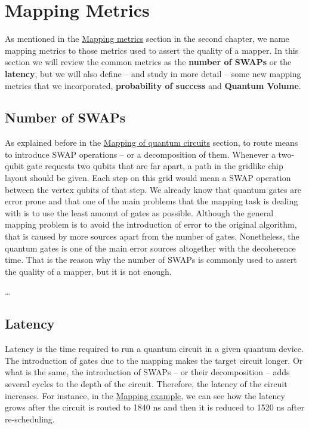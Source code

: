\section*{Mapping Metrics}
\label{sec:orgcd731e4}
As mentioned in the \href{chapter-2.org}{Mapping metrics} section in the second chapter, we name mapping metrics to those metrics used to assert the quality of a mapper.
In this section we will review the common metrics as the \textbf{number of SWAPs} or the \textbf{latency}, but we will also define -- and study in more detail -- some new mapping metrics that we incorporated, \textbf{probability of success} and \textbf{Quantum Volume}.

\subsection*{Number of SWAPs}
\label{sec:org2391f4b}

As explained before in the \href{chapter-2.org}{Mapping of quantum circuits} section, to route means to introduce SWAP operations -- or a decomposition of them.
Whenever a two-qubit gate requests two qubits that are far apart, a path in the gridlike chip layout should be given.
Each step on this grid would mean a SWAP operation between the vertex qubits of that step.
We already know that quantum gates are error prone and that one of the main problems that the mapping task is dealing with is to use the least amount of gates as possible.
Although the general mapping problem is to avoid the introduction of error to the original algorithm, that is caused by more sources apart from the number of gates.
Nonetheless, the quantum gates is one of the main error sources altogether with the decoherence time.
That is the reason why the number of SWAPs is commonly used to assert the quality of a mapper, but it is not enough.

\ldots{}

\subsection*{Latency}
\label{sec:org24c2881}

Latency is the time required to run a quantum circuit in a given quantum device.
The introduction of gates due to the mapping makes the target circuit longer.
Or what is the same, the introduction of SWAPs -- or their decomposition -- adds several cycles to the depth of the circuit.
Therefore, the latency of the circuit increases.
For instance, in the \href{mapping_of_quantum_circuits.org}{Mapping example}, we can see how the latency grows after the circuit is routed to 1840 ns and then it is reduced to 1520 ns after re-scheduling.


